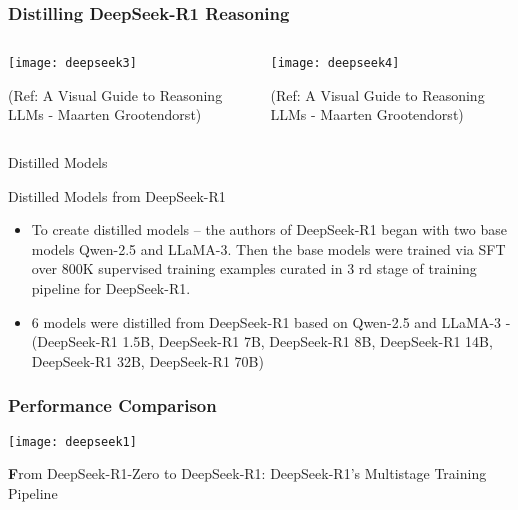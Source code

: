 \begin{frame}[fragile]\frametitle{Distilling DeepSeek-R1 Reasoning}
\begin{columns}
    \begin{column}[T]{0.5\linewidth}
        \begin{center}
        \texttt{[image: deepseek3]}
		
		{\tiny (Ref: A Visual Guide to Reasoning LLMs - Maarten Grootendorst)}
		
        \end{center} 
    \end{column}
    \begin{column}[T]{0.5\linewidth}
        \begin{center}
        \texttt{[image: deepseek4]}
		
		{\tiny (Ref: A Visual Guide to Reasoning LLMs - Maarten Grootendorst)}
		
        \end{center}    
    \end{column}
  \end{columns}
\end{frame}

\begin{frame}[fragile]{ Distilled Models}

Distilled Models from DeepSeek-R1

    \begin{itemize}
        \item   To create distilled models – the authors of DeepSeek-R1 began with two 
base models Qwen-2.5  and LLaMA-3. Then the base models were trained 
via SFT over 800K supervised training examples curated in 3 rd  stage of 
training pipeline for DeepSeek-R1. 
        \item  6 models were distilled from DeepSeek-R1 based on Qwen-2.5 and 
LLaMA-3 - (DeepSeek-R1 1.5B, DeepSeek-R1 7B, DeepSeek-R1 8B, 
DeepSeek-R1 14B, DeepSeek-R1 32B, DeepSeek-R1 70B)
    \end{itemize}
\end{frame}


\begin{frame}[fragile]\frametitle{ Performance Comparison}
		\begin{center}
		\texttt{[image: deepseek1]}
		
				{\textbf From DeepSeek-R1-Zero to DeepSeek-R1: DeepSeek-R1's Multistage Training Pipeline}

		\end{center}

\end{frame}

